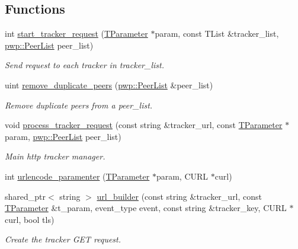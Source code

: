 \subsection*{Functions}
\begin{DoxyCompactItemize}
\item 
int \hyperlink{namespacetracker_afbc30ba2b5f62968e92fedaaa8eab454}{start\+\_\+tracker\+\_\+request} (\hyperlink{structtracker_1_1TParameter}{T\+Parameter} $\ast$param, const T\+List \&tracker\+\_\+list, \hyperlink{namespacepwp_ad07fa6df116b205302ad5ec172277184}{pwp\+::\+Peer\+List} peer\+\_\+list)
\begin{DoxyCompactList}\small\item\em Send request to each tracker in tracker\+\_\+list. \end{DoxyCompactList}\item 
uint \hyperlink{namespacetracker_ab1ce1ce0570dd4742e06b6941f63dbe4}{remove\+\_\+duplicate\+\_\+peers} (\hyperlink{namespacepwp_ad07fa6df116b205302ad5ec172277184}{pwp\+::\+Peer\+List} \&peer\+\_\+list)
\begin{DoxyCompactList}\small\item\em Remove duplicate peers from a peer\+\_\+list. \end{DoxyCompactList}\item 
void \hyperlink{namespacetracker_ab13f3471f16db9505c2853f4e1bde3aa}{process\+\_\+tracker\+\_\+request} (const string \&tracker\+\_\+url, const \hyperlink{structtracker_1_1TParameter}{T\+Parameter} $\ast$param, \hyperlink{namespacepwp_ad07fa6df116b205302ad5ec172277184}{pwp\+::\+Peer\+List} peer\+\_\+list)
\begin{DoxyCompactList}\small\item\em Main http tracker manager. \end{DoxyCompactList}\item 
int \hyperlink{namespacetracker_a0158d3629445e060aef8608eefff5f09}{urlencode\+\_\+paramenter} (\hyperlink{structtracker_1_1TParameter}{T\+Parameter} $\ast$param, C\+U\+RL $\ast$curl)
\item 
shared\+\_\+ptr$<$ string $>$ \hyperlink{namespacetracker_a60c22f265981fba0a5dad14d6d3d516a}{url\+\_\+builder} (const string \&tracker\+\_\+url, const \hyperlink{structtracker_1_1TParameter}{T\+Parameter} \&t\+\_\+param, event\+\_\+type event, const string \&tracker\+\_\+key, C\+U\+RL $\ast$curl, bool tls)
\begin{DoxyCompactList}\small\item\em Create the tracker G\+ET request. \end{DoxyCompactList}\item 

\end{DoxyCompactItemize}

